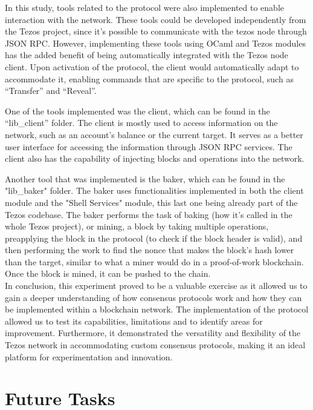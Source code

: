 In this study, tools related to the protocol were also implemented to enable interaction with the network. These tools could be developed independently from the Tezos project, since it's possible to communicate with the tezos node through JSON RPC. However, implementing these tools using OCaml and Tezos modules has the added benefit of being automatically integrated with the Tezos node client. Upon activation of the protocol, the client would automatically adapt to accommodate it, enabling commands that are specific to the protocol, such as ``Transfer'' and ``Reveal''.

One of the tools implemented was the client, which can be found in the ``lib\_client'' folder. The client is mostly used to access information on the network, such as an account's balance or the current target. It serves as a better user interface for accessing the information through JSON RPC services. The client also has the capability of injecting blocks and operations into the network.

Another tool that was implemented is the baker, which can be found in the "lib\_baker" folder. The baker uses functionalities implemented in both the client module and the "Shell Services" module, this last one being already part of the Tezos codebase.
The baker performs the task of baking (how it's called in the whole Tezos project), or mining, a block by taking multiple operations, preapplying the block in the protocol (to check if the block header is valid), and then performing the work to find the nonce that makes the block's hash lower than the target, similar to what a miner would do in a proof-of-work blockchain. Once the block is mined, it can be pushed to the chain.\\


In conclusion, this experiment proved to be a valuable exercise as it allowed us to gain a deeper understanding of how consensus protocols work and how they can be implemented within a blockchain network. The implementation of the protocol allowed us to test its capabilities, limitations and to identify areas for improvement. Furthermore, it demonstrated the versatility and flexibility of the Tezos network in accommodating custom consensus protocols, making it an ideal platform for experimentation and innovation.

\section{Future Tasks}

